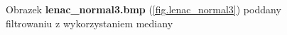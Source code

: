 \documentclass{classrep}
\begin{document}
\begin{figure}
{{  \label{fig.lenac_normal3_median_5x5}
 }
}
\caption{Obrazek \textbf{lenac\_normal3.bmp} (\ref{fig.lenac_normal3}) poddany filtrowaniu z wykorzystaniem mediany}
\label{fig.lenac_normal3_median}
\end{figure}
\end{document}
